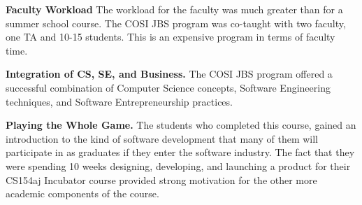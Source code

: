 \documentclass{sig-alternate}
\begin{document}
{\bf Faculty Workload} The workload for the faculty was much greater than for a summer school course. The COSI JBS program was co-taught with two faculty, one TA and 10-15 students. This is an expensive program in terms of faculty time.

{\bf Integration of CS, SE, and Business.}  The COSI JBS program offered a successful combination of Computer Science concepts, Software Engineering techniques, and Software Entrepreneurship practices.

{\bf Playing the Whole Game.} The students who completed this course, gained an introduction to the kind of software development that many of them will participate in as graduates if they enter the software industry. The fact that they were spending 10 weeks designing, developing, and launching a product for their CS154aj Incubator course provided strong motivation for the other more academic components of the course.
\end{document}
